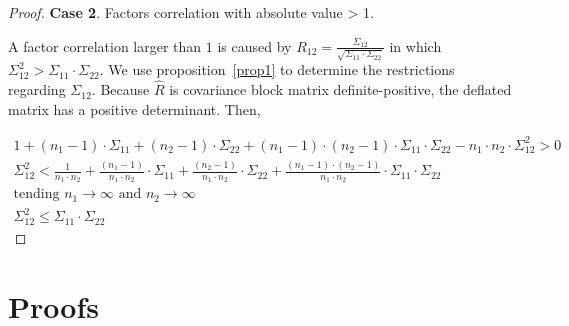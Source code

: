 \documentclass[11pt,fleqn]{book} %
\begin{document}
\begin{proof}
	\textbf{Case 2}. Factors correlation with absolute value > 1.
	\begin{adjustwidth}{1cm}{0pt}
		A factor correlation larger than $1$ is caused by 
		$R_{12} = \frac{\Sigma_{12}}{\sqrt{\Sigma_{11} \cdot \Sigma_{22}}}$
		in which $\Sigma_{12}^2 > \Sigma_{11} \cdot \Sigma_{22}$.
		We use proposition~\ref{prop1} to determine the restrictions regarding 
		$\Sigma_{12}$. Because $\widehat{R}$ is covariance block matrix 
		definite-positive, the deflated matrix has a positive determinant. 
		Then,
	\end{adjustwidth}
	\begin{displaymath}
		\begin{array}{l}
			1 + (n_1-1) \cdot \Sigma_{11} + (n_2-1) \cdot \Sigma_{22} +
			(n_1-1) \cdot (n_2-1) \cdot \Sigma_{11} \cdot \Sigma_{22} -
			n_1 \cdot n_2 \cdot \Sigma_{12}^2 > 0
			\\
			\Sigma_{12}^2 <
			\frac{1}{n_1 \cdot n_2} +
			\frac{(n_1-1)}{n_1 \cdot n_2} \cdot \Sigma_{11} +
			\frac{(n_2-1)}{n_1 \cdot n_2} \cdot \Sigma_{22} +
			\frac{(n_1-1) \cdot (n_2-1)}{n_1 \cdot n_2} \cdot \Sigma_{11} \cdot \Sigma_{22}
			\\
			\text{tending } n_1 \to \infty \text{ and } n_2 \to \infty
			\\
			\Sigma_{12}^2 \le \Sigma_{11} \cdot \Sigma_{22}
		\end{array}
	\end{displaymath}
\end{proof}


\chapter{Proofs}

\section{}
\end{document}
